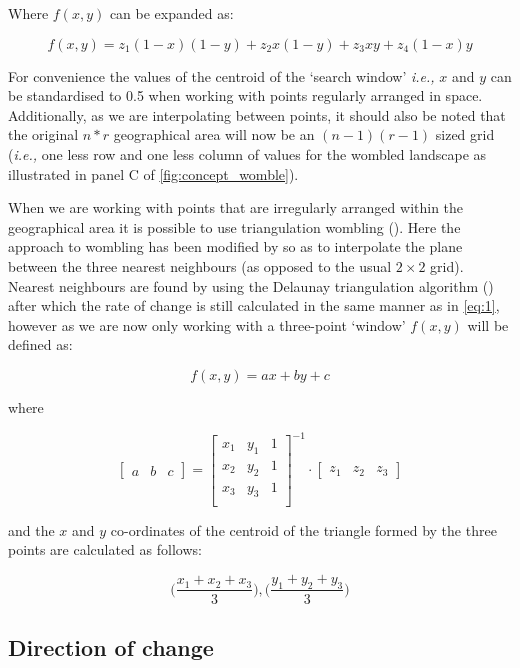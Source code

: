 \begin{refsection}
Where \(f(x,y)\) can be expanded as:

$$f(x,y) = z_{1}(1-x)(1-y) + z_{2}x(1-y) + z_{3}x y + z_{4}(1-x)y$$

For convenience the values of the centroid of the `search window'
\emph{i.e.,} \(x\) and \(y\) can be standardised to 0.5 when working with
points regularly arranged in space. Additionally, as we are
interpolating between points, it should also be noted that the original
\(n*r\) geographical area will now be an \((n -1)(r - 1)\) sized grid
(\emph{i.e.,} one less row and one less column of values for the wombled
landscape as illustrated in panel C of \autoref{fig:concept_womble}).

When we are working with points that are irregularly arranged within the
geographical area it is possible to use triangulation wombling
(\cite{Fortin2005SpaAna, Fortin2021Network, Fortin1994EdgDet}). Here the
approach to wombling has been modified by \cite{Fortin1992DetEco} so as to
interpolate the plane between the three nearest neighbours (as opposed
to the usual \(2 \times 2\) grid). Nearest neighbours are found by using
the Delaunay triangulation algorithm (\cite{Delaunay1934SphVid}) after
which the rate of change is still calculated in the same manner as in
\autoref{eq:1}, however as we are now only working with a three-point
`window' \(f(x,y)\) will be defined as:

$$f(x,y) = ax + by + c$$

where

$$\left[ \begin{array}{ccc} a & b & c \end{array} \right] = 
\left[ {\begin{array}{ccc}
   x_{1} & y_{1} & 1\\
   x_{2} & y_{2} & 1\\
   x_{3} & y_{3} & 1\\
  \end{array} } \right]^{-1}\cdot
  \left[
  \begin{array}{ccc} z_{1} & z_{2} & z_{3} \end{array} \right]$$

and the \(x\) and \(y\) co-ordinates of the centroid of the triangle
formed by the three points are calculated as follows:

$$ \Big( \frac{x_{1} + x_{2} + x_{3}}{3} \Big), \Big( \frac{y_{1} + y_{2} + y_{3}}{3} \Big) $$

\subsection{Direction of change}\label{direction-of-change}


\end{refsection}
